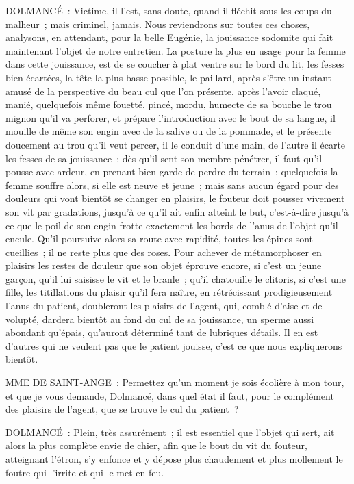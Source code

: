 \documentclass[french,twoside]{book} %
\begin{document}
DOLMANCÉ : Victime, il l’est, sans doute, quand il fléchit sous les coups du malheur ; mais criminel, jamais. Nous reviendrons sur toutes ces choses, analysons, en attendant, pour la belle Eugénie, la jouissance sodomite qui fait maintenant l’objet de notre entretien. La posture la plus en usage pour la femme dans cette jouissance, est de se coucher à plat ventre sur le bord du lit, les fesses bien écartées, la tête la plus basse possible, le paillard, après s’être un instant amusé de la perspective du beau cul que l’on présente, après l’avoir claqué, manié, quelquefois même fouetté, pincé, mordu, humecte de sa bouche le trou mignon qu’il va perforer, et prépare l’introduction avec le bout de sa langue, il mouille de même son engin avec de la salive ou de la pommade, et le présente doucement au trou qu’il veut percer, il le conduit d’une main, de l’autre il écarte les fesses de sa jouissance ; dès qu’il sent son membre pénétrer, il faut qu’il pousse avec ardeur, en prenant bien garde de perdre du terrain ; quelquefois la femme souffre alors, si elle est neuve et jeune ; mais sans aucun égard pour des douleurs qui vont bientôt se changer en plaisirs, le fouteur doit pousser vivement son vit par gradations, jusqu’à ce qu’il ait enfin atteint le but, c’est-à-dire jusqu’à ce que le poil de son engin frotte exactement les bords de l’anus de l’objet qu’il encule. Qu’il poursuive alors sa route avec rapidité, toutes les épines sont cueillies ; il ne reste plus que des roses. Pour achever de métamorphoser en plaisirs les restes de douleur que son objet éprouve encore, si c’est un jeune garçon, qu’il lui saisisse le vit et le branle ; qu’il chatouille le clitoris, si c’est une fille, les titillations du plaisir qu’il fera naître, en rétrécissant prodigieusement l’anus du patient, doubleront les plaisirs de l’agent, qui, comblé d’aise et de volupté, dardera bientôt au fond du cul de sa jouissance, un sperme aussi abondant qu’épais, qu’auront déterminé tant de lubriques détails. Il en est d’autres qui ne veulent pas que le patient jouisse, c’est ce que nous expliquerons bientôt.\par
MME DE SAINT-ANGE : Permettez qu’un moment je sois écolière à mon tour, et que je vous demande, Dolmancé, dans quel état il faut, pour le complément des plaisirs de l’agent, que se trouve le cul du patient ?\par
DOLMANCÉ : Plein, très assurément ; il est essentiel que l’objet qui sert, ait alors la plus complète envie de chier, afin que le bout du vit du fouteur, atteignant l’étron, s’y enfonce et y dépose plus chaudement et plus mollement le foutre qui l’irrite et qui le met en feu.\par
\end{document}

